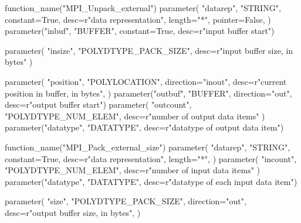 %
\begin{mpi-binding}
    function_name("MPI_Unpack_external")
    parameter(
        "datarep",
        "STRING",
        constant=True,
        desc=r"data representation",
        length="*",
        pointer=False,
    )
    parameter("inbuf", "BUFFER", constant=True, desc=r"input buffer start")

    parameter(
        "insize", "POLYDTYPE_PACK_SIZE", desc=r"input buffer size, in bytes"
    )

    parameter(
        "position",
        "POLYLOCATION",
        direction="inout",
        desc=r"current position in buffer, in bytes",
    )
    parameter("outbuf", "BUFFER", direction="out", desc=r"output buffer start")
    parameter(
        "outcount", "POLYDTYPE_NUM_ELEM", desc=r"number of output data items"
    )
    parameter("datatype", "DATATYPE", desc=r"datatype of output data item")
\end{mpi-binding}

%
\begin{mpi-binding}
    function_name("MPI_Pack_external_size")
    parameter(
        "datarep",
        "STRING",
        constant=True,
        desc=r"data representation",
        length="*",
    )
    parameter(
        "incount", "POLYDTYPE_NUM_ELEM", desc=r"number of input data items"
    )
    parameter("datatype", "DATATYPE", desc=r"datatype of each input data item")

    parameter(
        "size",
        "POLYDTYPE_PACK_SIZE",
        direction="out",
        desc=r"output buffer size, in bytes",
    )
\end{mpi-binding}
